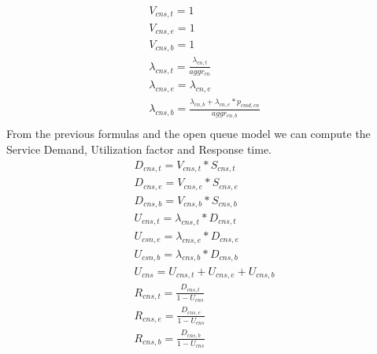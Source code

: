 \documentclass[11pt]{article}
\begin{document}
\begin{equation}
	\begin{array}{l}
		V_{cns, t} = 1 \\
		V_{cns, e} = 1 \\
		V_{cns, b} = 1 \\
		\lambda_{cns, t} = \frac{\lambda_{cn,t}}{aggr_{cn}} \\
		\lambda_{cns, e} = \lambda_{cn,e} \\
		\lambda_{cns, b} = \frac{\lambda_{cn,b}+\lambda_{cn,e}*p_{cmd,cn}}{aggr_{cn,b}} \\
	\end{array}
\end{equation}
From the previous formulas and the open queue model we can compute the Service Demand, Utilization factor and Response time.
\begin{equation}
	\begin{array}{l}
		D_{cns, t} = V_{cns, t} * S_{cns, t} \\
		D_{cns, e} = V_{cns, e} * S_{cns, e} \\
		D_{cns, b} = V_{cns, b} * S_{cns, b} \\
		U_{cns, t} = \lambda_{cns, t} * D_{cns, t} \\
		U_{csn, e} = \lambda_{cns, e} * D_{cns, e} \\
		U_{csn, b} = \lambda_{cns, b} * D_{cns, b} \\
		U_{cns} = U_{cns, t} + U_{cns, e} + U_{cns, b}\\
		R_{cns, t} = \frac{D_{cns, t}}{1 - U_{cns}} \\
		R_{cns, e} = \frac{D_{cns, e}}{1 - U_{cns}} \\
		R_{cns, b} = \frac{D_{cns, b}}{1 - U_{cns}} \\
	\end{array}
\end{equation}
\end{document}
